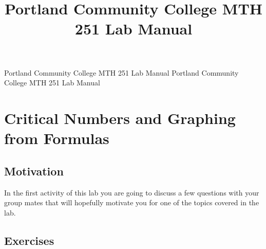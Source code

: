 \documentclass[12pt,]{book}
\title{Portland Community College MTH 251 Lab Manual}
\author{}
\date{}
\theoremstyle{plain}
\theoremstyle{definition}
\numberwithin{equation}{section}
\begin{document}
\frontmatter
\thispagestyle{empty}
{\centering
\vspace*{0.28\textheight}
{\Huge Portland Community College MTH 251 Lab Manual}}
\clearpage
\thispagestyle{empty}
\null%
\clearpage
\thispagestyle{empty}
{\centering
\vspace*{0.14\textheight}
{\Huge Portland Community College MTH 251 Lab Manual}\\[2\baselineskip]
}
\clearpage
\thispagestyle{empty}
\null\clearpage
\setcounter{tocdepth}{1}
\renewcommand*\contentsname{Contents}
\tableofcontents
\mainmatter
\typeout{************************************************}
\typeout{************************************************}
\chapter[Critical Numbers and Graphing from Formulas]{Critical Numbers and Graphing from Formulas}\label{chapter-critical-numbers-graphing-from-formulas}
\typeout{************************************************}
\typeout{************************************************}
\section[Motivation]{Motivation}\label{section-motivation-for-critical-numbers}
In the first activity of this lab you are going to discuss a few questions with your group mates that will hopefully motivate you for one of the topics covered in the lab.%
\typeout{************************************************}
\typeout{************************************************}
\section*{Exercises}\label{exercises-1}
\end{document}
